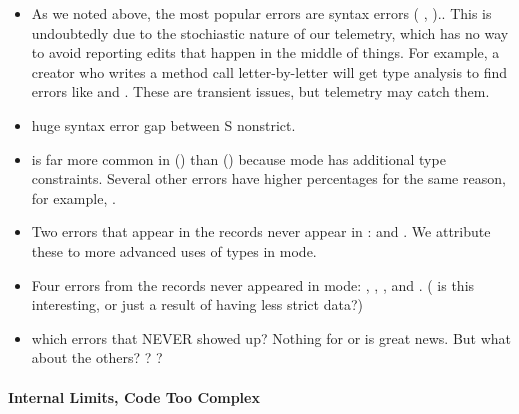 \documentclass[english,submission,cleveref]{programming}
\begin{document}
\begin{itemize}
  \item
    As we noted above, the most popular errors are syntax errors
    (\FILL{}  \mnonstrict{},  \mstrict{})..
    This is undoubtedly due to the stochiastic nature
    of our telemetry, which has no way to avoid
    reporting edits that happen in the middle of things.
    For example, a creator who writes a method call
     letter-by-letter will
    get type analysis to find errors like 
    and .
    These are transient issues, but telemetry may catch them.

  \item
    \FILL{} huge syntax error gap between S nonstrict.

  \item
     is far more common in \mstrict{} ()
    than \mnonstrict{} () because \mstrict{} mode
    has additional type constraints.
    Several other errors have higher \mstrict{} percentages for the
    same reason, for example, .

  \item
    Two errors that appear in the \mstrict{} records
    never appear in \mnonstrict{}:  and .
    We attribute these to more advanced uses of types in \mstrict{} mode.

  \item
    Four errors from the \mnonstrict{} records never appeared in \mstrict{} mode:
    , ,
    , and .
    (\QALAN{} is this interesting, or just a result of having less strict data?)

  \item
    \FILL{} which errors that NEVER showed up?
    Nothing for  or  is great news.
    But what about the others?
    ?
    ?

\end{itemize}

\paragraph{Internal Limits, Code Too Complex}
\label{s:code-too-complex}
\end{document}
